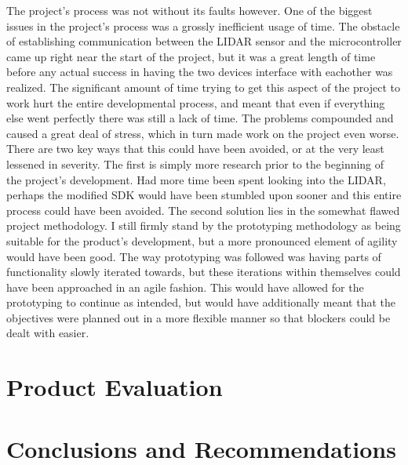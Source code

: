 	The project's process was not without its faults however. One of the biggest issues in the project's process was a grossly inefficient usage of time. The obstacle of establishing communication between the LIDAR sensor and the microcontroller came up right near the start of the project, but it was a great length of time before any actual success in having the two devices interface with eachother was realized. The significant amount of time trying to get this aspect of the project to work hurt the entire developmental process, and meant that even if everything else went perfectly there was still a lack of time. The problems compounded and caused a great deal of stress, which in turn made work on the project even worse. There are two key ways that this could have been avoided, or at the very least lessened in severity. The first is simply more research prior to the beginning of the project's development. Had more time been spent looking into the LIDAR, perhaps the modified SDK would have been stumbled upon sooner and this entire process could have been avoided. The second solution lies in the somewhat flawed project methodology. I still firmly stand by the prototyping methodology as being suitable for the product's development, but a more pronounced element of agility would have been good. The way prototyping was followed was having parts of functionality slowly iterated towards, but these iterations within themselves could have been approached in an agile fashion. This would have allowed for the prototyping to continue as intended, but would have additionally meant that the objectives were planned out in a more flexible manner so that blockers could be dealt with easier.
	
	\chapter{Product Evaluation}
	
	
	\chapter{Conclusions and Recommendations}